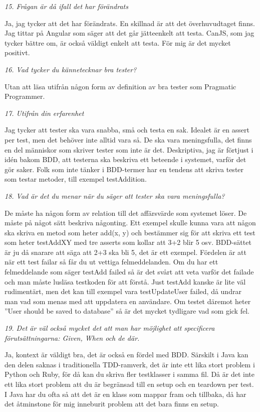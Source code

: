 \documentclass[11pt]{article}
\begin{document}
\emph{15. Frågan är då ifall det har förändrats}

Ja, jag tycker att det har förändrats. En skillnad är att det överhuvudtaget finns. Jag tittar på Angular som säger att det går jätteenkelt att testa. CanJS, som jag tycker bättre om, är också väldigt enkelt att testa. För mig är det mycket positivt.

\emph{16. Vad tycker du kännetecknar bra tester?}

Utan att läsa utifrån någon form av definition av bra tester som Pragmatic Programmer.

\emph{17. Utifrån din erfarenhet}

Jag tycker att tester ska vara snabba, små och testa en sak. Idealet är en assert per test, men det behöver inte alltid vara så. De ska vara meningsfulla, det finns en del människor som skriver tester som inte är det. Deskriptiva, jag är förtjust i idén bakom BDD, att testerna ska beskriva ett beteende i systemet, varför det gör saker. Folk som inte tänker i BDD-termer har en tendens att skriva tester som testar metoder, till exempel testAddition.

\emph{18. Vad är det du menar när du säger att tester ska vara meningsfulla?}

De måste ha någon form av relation till det affärsvärde som systemet löser. De måste på något sätt beskriva någonting. Ett exempel skulle kunna vara att någon ska skriva en metod som heter add(x, y) och bestämmer sig för att skriva ett test som heter testAddXY med tre asserts som kollar att 3+2 blir 5 osv. BDD-sättet är ju då snarare att säga att 2+3 ska bli 5, det är ett exempel. Fördelen är att när ett test failar så får du ut vettiga felmeddelanden. Om du har ett felmeddelande som säger testAdd failed så är det svårt att veta varför det failade och man måste lusläsa testkoden för att förstå. Just testAdd kanske är lite väl rudimentärt, men det kan till exempel vara testUpdateUser failed, då undrar man vad som menas med att uppdatera en användare. Om testet däremot heter ”User should be saved to database” så är det mycket tydligare vad som gick fel.

\emph{19. Det är väl också mycket det att man har möjlighet att specificera förutsättningarna: Given, When och de där.}

Ja, kontext är väldigt bra, det är också en fördel med BDD. Särskilt i Java kan den delen saknas i traditionella TDD-ramverk, det är inte ett lika stort problem i Python och Ruby, för då kan du skriva fler testklasser i samma fil. Då är det inte ett lika stort problem att du är begränsad till en setup och en teardown per test. I Java har du ofta så att det är en klass som mappar fram och tillbaka, då har det åtminstone för mig inneburit problem att det bara finns en setup.
\end{document}
